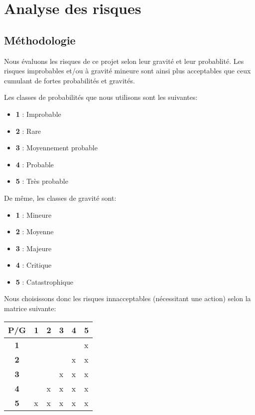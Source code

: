 \chapter{Analyse des risques}

\section{Méthodologie}
Nous évaluons les risques de ce projet selon leur gravité et leur probablité. Les risques improbables et/ou à gravité mineure sont ainsi plus acceptables que ceux cumulant de fortes probabilités et gravités.

Les classes de probabilités que nous utilisons sont les suivantes:

\begin{itemize}
  \item \textbf{1} : Improbable 
  \item \textbf{2} : Rare
  \item \textbf{3} : Moyennement probable
  \item \textbf{4} : Probable
  \item \textbf{5} : Très probable
\end{itemize}

De même, les classes de gravité sont:

\begin{itemize}
  \item \textbf{1} : Mineure 
  \item \textbf{2} : Moyenne
  \item \textbf{3} : Majeure
  \item \textbf{4} : Critique
  \item \textbf{5} : Catastrophique
\end{itemize}

Nous choisissons donc les risques innacceptables (nécessitant une action) selon la matrice suivante:

\begin{tabular}{|c|l|l|l|l|l|}
     \hline
         P/G & \textbf{1} & \textbf{2} & \textbf{3} & \textbf{4} & \textbf{5}  \\ \hline
         \textbf{1} &   &   &   &   & x \\ \hline
         \textbf{2} &   &   &   & x & x \\ \hline
         \textbf{3} &   &   & x & x & x \\ \hline
         \textbf{4} &   & x & x & x & x \\ \hline
         \textbf{5} & x & x & x & x & x \\
     \hline
\end{tabular}


